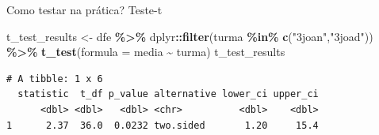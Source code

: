 \documentclass[
  9pt,
  ignorenonframetext,
  aspectratio=169]{beamer}
\newenvironment{Shaded}{\begin{snugshade}}{\end{snugshade}}
\newcommand{\DataTypeTok}[1]{\textcolor[rgb]{0.13,0.29,0.53}{#1}}
\newcommand{\KeywordTok}[1]{\textcolor[rgb]{0.13,0.29,0.53}{\textbf{#1}}}
\newcommand{\NormalTok}[1]{#1}
\newcommand{\OperatorTok}[1]{\textcolor[rgb]{0.81,0.36,0.00}{\textbf{#1}}}
\newcommand{\StringTok}[1]{\textcolor[rgb]{0.31,0.60,0.02}{#1}}
\begin{document}
\begin{frame}[fragile]{Como testar na prática? Teste-t}
\protect\hypertarget{como-testar-na-pruxe1tica-teste-t-1}{}
\begin{Shaded}
\begin{Highlighting}[]
\NormalTok{t\_test\_results \textless{}{-}}\StringTok{ }\NormalTok{dfe }\OperatorTok{\%\textgreater{}\%}\StringTok{ }
\StringTok{  }\NormalTok{dplyr}\OperatorTok{::}\KeywordTok{filter}\NormalTok{(turma }\OperatorTok{\%in\%}\StringTok{ }\KeywordTok{c}\NormalTok{(}\StringTok{"3joan"}\NormalTok{,}\StringTok{"3joad"}\NormalTok{)) }\OperatorTok{\%\textgreater{}\%}\StringTok{ }
\StringTok{  }\KeywordTok{t\_test}\NormalTok{(}\DataTypeTok{formula =}\NormalTok{ media }\OperatorTok{\textasciitilde{}}\StringTok{ }\NormalTok{turma)}
\NormalTok{t\_test\_results}
\end{Highlighting}
\end{Shaded}

\begin{verbatim}
# A tibble: 1 x 6
  statistic  t_df p_value alternative lower_ci upper_ci
      <dbl> <dbl>   <dbl> <chr>          <dbl>    <dbl>
1      2.37  36.0  0.0232 two.sided       1.20     15.4
\end{verbatim}
\end{frame}
\end{document}
